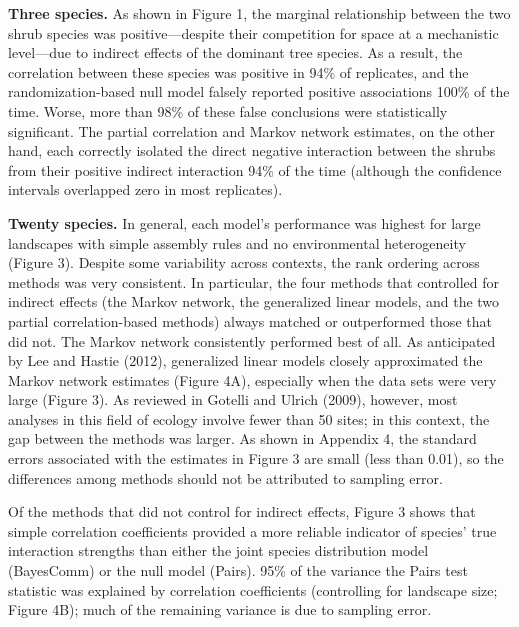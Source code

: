 \documentclass[12pt,]{article}
\begin{document}
\begin{spacing}{1.9}
\begin{flushleft}
\noindent \textbf{Three species.} As shown in Figure 1, the marginal
relationship between the two shrub species was positive---despite their
competition for space at a mechanistic level---due to indirect effects
of the dominant tree species. As a result, the correlation between these
species was positive in 94\% of replicates, and the randomization-based
null model falsely reported positive associations 100\% of the time.
Worse, more than 98\% of these false conclusions were statistically
significant. The partial correlation and Markov network estimates, on
the other hand, each correctly isolated the direct negative interaction
between the shrubs from their positive indirect interaction 94\% of the
time (although the confidence intervals overlapped zero in most
replicates).

\noindent
\textbf{Twenty species.} In general, each model's performance was
highest for large landscapes with simple assembly rules and no
environmental heterogeneity (Figure 3). Despite some variability across
contexts, the rank ordering across methods was very consistent. In
particular, the four methods that controlled for indirect effects (the
Markov network, the generalized linear models, and the two partial
correlation-based methods) always matched or outperformed those that did
not. The Markov network consistently performed best of all. As
anticipated by Lee and Hastie (2012), generalized linear models closely
approximated the Markov network estimates (Figure 4A), especially when
the data sets were very large (Figure 3). As reviewed in Gotelli and
Ulrich (2009), however, most analyses in this field of ecology involve
fewer than 50 sites; in this context, the gap between the methods was
larger. As shown in Appendix 4, the standard errors associated with the
estimates in Figure 3 are small (less than 0.01), so the differences
among methods should not be attributed to sampling error.

Of the methods that did not control for indirect effects, Figure 3 shows
that simple correlation coefficients provided a more reliable indicator
of species' true interaction strengths than either the joint species
distribution model (BayesComm) or the null model (Pairs). 95\% of the
variance the Pairs test statistic was explained by correlation
coefficients (controlling for landscape size; Figure 4B); much of the
remaining variance is due to sampling error.


\end{flushleft}
\end{spacing}
\end{document}
